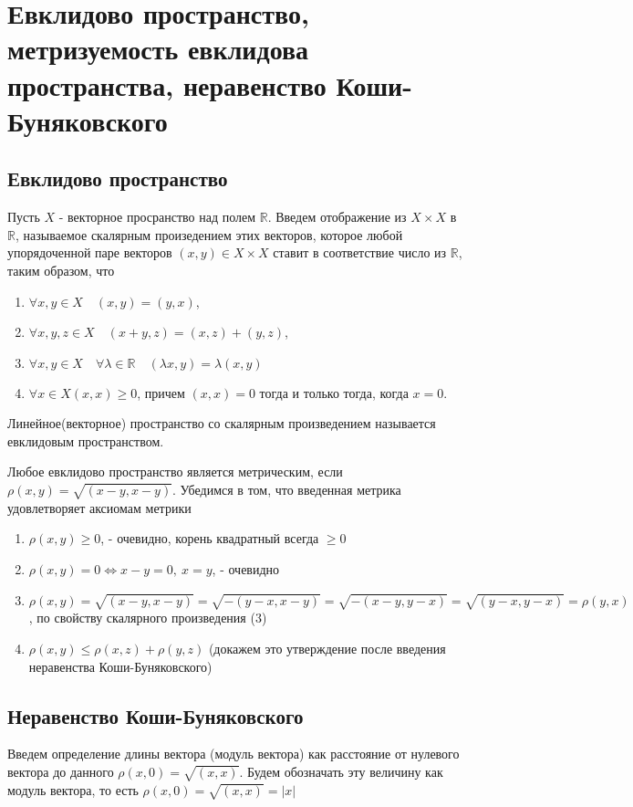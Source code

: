 \section{Евклидово пространство, метризуемость евклидова пространства, неравенство Коши-Буняковского}
\subsection{Евклидово пространство}

Пусть $X$ - векторное просранство над полем $\mathbb {R}$. Введем отображение из $X \times X$ в $\mathbb {R}$, называемое скалярным произедением этих векторов, которое любой упорядоченной паре векторов $(x, y) \in X \times X$ ставит в соответствие число из $\mathbb {R}$, таким образом, что


\begin{enumerate} 
  \item $\forall x,y \in X \quad (x, y) = (y, x)$,
  \item  $\forall x,y,z \in X \quad (x + y, z) = (x, z) + (y, z)$,
  \item $\forall x,y \in X \quad \forall \lambda \in \mathbb {R} \quad (\lambda x, y) = \lambda(x, y)$
  \item $\forall x \in X (x, x) \geq 0$, причем $(x, x) = 0$ тогда и только тогда, когда $x = 0$.
\end{enumerate}
Линейное(векторное) пространство со скалярным произведением называется евклидовым пространством.

Любое евклидово пространство является метрическим, если $\rho(x, y) = \sqrt{(x - y, x - y)}$. Убедимся в том, что введенная метрика удовлетворяет аксиомам метрики
\begin{enumerate} 
  \item $\rho(x, y) \geq 0$, - очевидно, корень квадратный всегда $\geq 0$ 
  \item  $\rho(x, y) = 0 \Leftrightarrow x-y = 0, \ x=y$, - очевидно
  \item $\rho(x, y) = \sqrt{(x - y, x - y)} = \sqrt{-(y-x, x - y)} = \sqrt{-(x -y, y - x)} = \sqrt{(y - x, y - x)}=\rho(y, x)$, по свойству скалярного произведения (3)
  \item $\rho(x, y) \leq \rho(x, z) + \rho(y, z)$ (докажем это утверждение после введения неравенства Коши-Буняковского)
\end{enumerate}
\subsection{Неравенство Коши-Буняковского}
Введем определение длины вектора (модуль вектора) как расстояние от нулевого вектора до данного $\rho(x, 0) = \sqrt{(x, x)}$. Будем обозначать эту величину как модуль вектора, то есть $\rho(x, 0) = \sqrt{(x, x)} = |x|$

